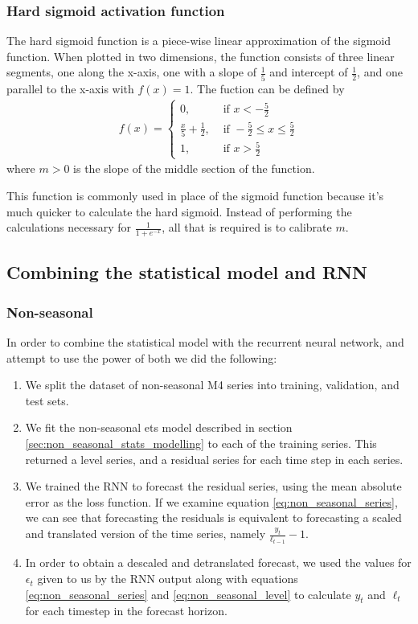 \documentclass[a4paper,12pt]{article}
\theoremstyle{definition}
\begin{document}
\subsubsection{Hard sigmoid activation function}\label{sec:hard_sigmoid}
The hard sigmoid function is a piece-wise linear approximation of the sigmoid function. When plotted in two dimensions, the function consists of three linear segments, one along the x-axis, one with a slope of $\frac{1}{5}$ and intercept of $\frac{1}{2}$, and one parallel to the x-axis with $f(x) = 1$. The fuction can be defined by 
\begin{align}
	f(x) = \begin{cases}
		0, &\text{ if } x < -\frac{5}{2} \\
		\frac{x}{5} + \frac{1}{2}, &\text{ if }  -\frac{5}{2} \leq x \leq \frac{5}{2} \\
		1, &\text{ if } x > \frac{5}{2}
	\end{cases}
\end{align}
where $m>0$ is the slope of the middle section of the function. 

This function is commonly used in place of the sigmoid function because it's much quicker to calculate the hard sigmoid. Instead of performing the calculations necessary for $\frac{1}{1 + e^{-x}}$, all that is required is to calibrate $m$. 

\subsection{Combining the statistical model and RNN}
\subsubsection{Non-seasonal}
In order to combine the statistical model with the recurrent neural network, and attempt to use the power of both we did the following:
\begin{enumerate}
	\item We split the dataset of non-seasonal M4 series into training, validation, and test sets.
	\item We fit the non-seasonal ets model described in section \ref{sec:non_seasonal_stats_modelling} to each of the training series. This returned a level series, and a residual series for each time step in each series. 
	\item We trained the RNN to forecast the residual series, using the mean absolute error as the loss function. If we examine equation \ref{eq:non_seasonal_series}, we can see that forecasting the residuals is equivalent to forecasting a scaled and translated version of the time series, namely $\frac{y_t}{\ell_{t-1}} - 1$.
	\item In order to obtain a descaled and detranslated forecast, we used the values for $\epsilon_t$ given to us by the RNN output along with equations \ref{eq:non_seasonal_series} and \ref{eq:non_seasonal_level} to calculate $y_t$ and $\ell_t$ for each timestep in the forecast horizon.
\end{enumerate}
\end{document}
